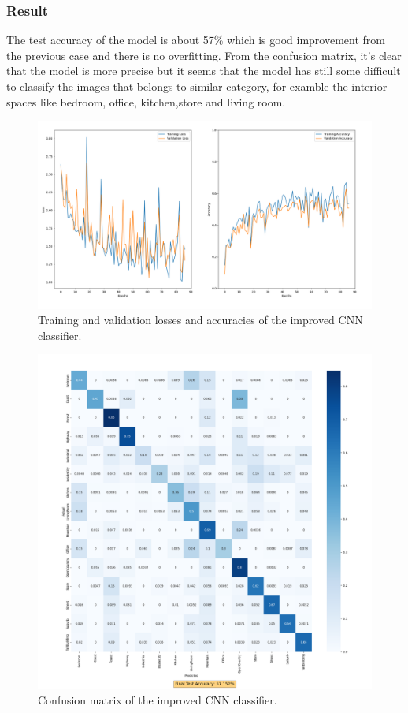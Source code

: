 \documentclass[12pt, a4paper, italian]{scrartcl}
\begin{document}
    \subsubsection{Result}
    The test accuracy of the model is about 57\% which is good improvement from the previous case and there is no overfitting.
From the confusion matrix, it's clear that the model is more precise but it seems that the model has still some difficult to classify the images that belongs to similar category, for examble the interior spaces like bedroom, office, kitchen,store and living room.
\newpage
         \begin{figure} [h!]
 \centering
  { \includegraphics[width=.75\textwidth]{fig/loss_and_accuracy_task_2_individual_network.png} \caption{Training and validation losses and accuracies of the improved CNN classifier.
}} 
  \end{figure}
 
  \begin{figure} [h!]
 \centering
  { \includegraphics[width=.75\textwidth]{fig/confusion_matrix_task_2_individual_network.png} \caption{Confusion matrix of the improved CNN classifier.
}} 
  \end{figure}
  
\end{document}
